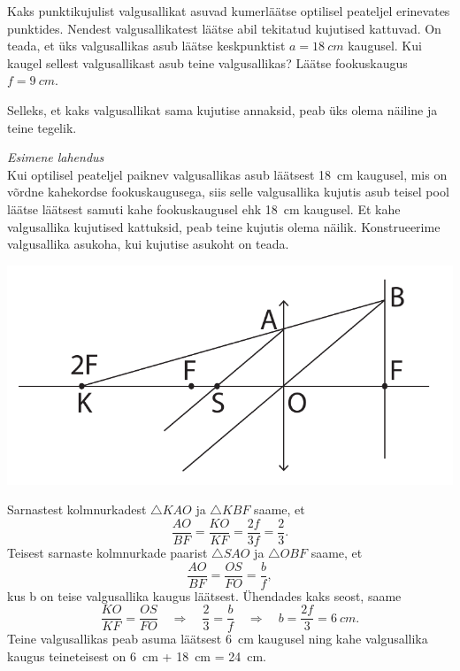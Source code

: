 
Kaks punktikujulist valgusallikat asuvad kumerläätse optilisel peateljel erinevates punktides. Nendest valgusallikatest läätse abil tekitatud kujutised kattuvad. On teada, et üks valgusallikas asub läätse keskpunktist $a=\SI{18}{cm}$ kaugusel. Kui kaugel sellest valgusallikast asub teine valgusallikas? Läätse fookuskaugus $f=\SI{9}{cm}$. 

\hint
Selleks, et kaks valgusallikat sama kujutise annaksid, peab üks olema näiline ja teine tegelik.

\solu
\emph{Esimene lahendus}\\
Kui optilisel peateljel paiknev valgusallikas asub läätsest \SI{18}{cm} kaugusel, mis on võrdne kahekordse fookuskaugusega, siis selle valgusallika kujutis asub teisel pool läätse läätsest samuti kahe fookuskaugusel ehk \SI{18}{cm} kaugusel. Et kahe valgusallika kujutised kattuksid, peab teine kujutis olema näilik.
Konstrueerime valgusallika asukoha, kui kujutise asukoht on teada. 
 \vspace{-10pt}
 \begin{center}
 \includegraphics[width=0.7\linewidth]{2018-v2g-02-valgusallikaslah}
 \end{center}
 \vspace{-10pt}

Sarnastest kolmnurkadest $\triangle KAO$ ja $\triangle KBF$ saame, et
\[ \frac{AO}{BF} = \frac{KO}{KF} = \frac{2f}{3f} = \frac{2}{3}. \]
Teisest sarnaste kolmnurkade paarist $\triangle SAO$ ja $\triangle OBF$ saame, et
\[ \frac{AO}{BF} = \frac{OS}{FO} = \frac{b}{f}, \]
kus b on teise valgusallika kaugus läätsest. Ühendades kaks seost, saame
\[ \frac{KO}{KF}=\frac{OS}{FO} \quad\Rightarrow\quad \frac{2}{3} = \frac{b}{f} \quad\Rightarrow\quad b = \frac{2f}{3} = \SI{6}{cm}. \]
Teine valgusallikas peab asuma läätsest \SI{6}{cm} kaugusel ning kahe valgusallika kaugus teineteisest on \SI{6}{cm} + \SI{18}{cm} = \SI{24}{cm}.

